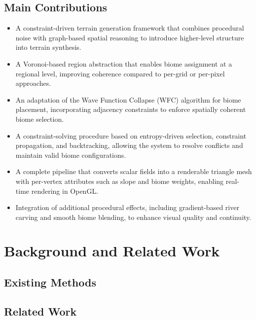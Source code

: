 \documentclass[12pt]{article}
\begin{document}
\subsection{Main Contributions}
\begin{itemize}
    \item A constraint-driven terrain generation framework that combines procedural noise with graph-based spatial reasoning to introduce higher-level structure into terrain synthesis.
    
    \item A Voronoi-based region abstraction that enables biome assignment at a regional level, improving coherence compared to per-grid or per-pixel approaches.
    
    \item An adaptation of the Wave Function Collapse (WFC) algorithm for biome placement, incorporating adjacency constraints to enforce spatially coherent biome selection.
    
    \item A constraint-solving procedure based on entropy-driven selection, constraint propagation, and backtracking, allowing the system to resolve conflicts and maintain valid biome configurations.
    
    \item A complete pipeline that converts scalar fields into a renderable triangle mesh with per-vertex attributes such as slope and biome weights, enabling real-time rendering in OpenGL.
    
    \item Integration of additional procedural effects, including gradient-based river carving and smooth biome blending, to enhance visual quality and continuity.
\end{itemize}



\section{Background and Related Work}

\subsection{Existing Methods}

\subsection{Related Work}
\end{document}
